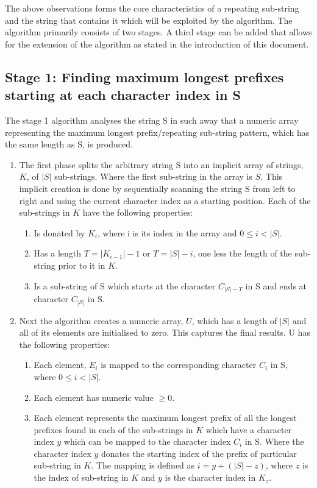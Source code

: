 \documentclass[12pt]{article}
\begin{document}
\begin{flushleft}
	The above observations forms the core characteristics of a repeating sub-string and the string that contains it which will be exploited by the algorithm. The algorithm primarily consists of two stages. A third stage can be added that allows for the extension of the algorithm as stated in the introduction of this document.
	
	\subsection{Stage 1: Finding maximum longest prefixes starting at each character index in S}
		The stage 1 algorithm analyses the string S in such away that a numeric array representing the maximum longest prefix/repeating sub-string pattern, which has the same length as S, is produced. 
	
		\begin{enumerate}	
		\item The first phase splits the arbitrary string S into an implicit array of strings, $K$, of $|S|$ sub-strings. Where the first sub-string in the array is $S$. This implicit creation is done by sequentially scanning the string S from left to right and using the current character index as a starting position.    
		Each of the sub-strings in $K$ have the following properties:
			\begin{enumerate}
				\item Is donated by $K_{i}$, where i is its index in the array and $ 0 \le i < |S|$.
				\item Has a length $T = |K_{i-1}| - 1$ or $T = |S| - i$, one less the length of the sub-string prior to it in $K$.
				\item Is a sub-string of S which starts at the character $C_{|S| - T} $ in S and ends at character $C_{|S|}$ in S.
			\end{enumerate}		
		
		\item Next the algorithm creates a numeric array, $U$, which has a length of $|S|$ and all of its elements are initialised to zero. This captures the final results.  
		U has the following properties:
			\begin{enumerate}
				\item Each element, $E_{i}$ is mapped to the corresponding character $C_{i}$ in S, where $ 0 \le i < |S|$.
				\item Each element has numeric value $\ge 0$.
				\item Each element represents the maximum longest prefix of all the longest prefixes found in each of the sub-strings in $K$ which have a character index $y$ which can be mapped to the character index $C_{i}$ in S. Where the character index $y$ donates the starting index of the prefix of particular sub-string in $K$. The mapping is defined as $i = y + (|S| - z)$, where $z$ is the index of sub-string in $K$ and $y$ is the character index in $K_{z}$. 
			\end{enumerate}
		

\end{enumerate}
\end{flushleft}
\end{document}
